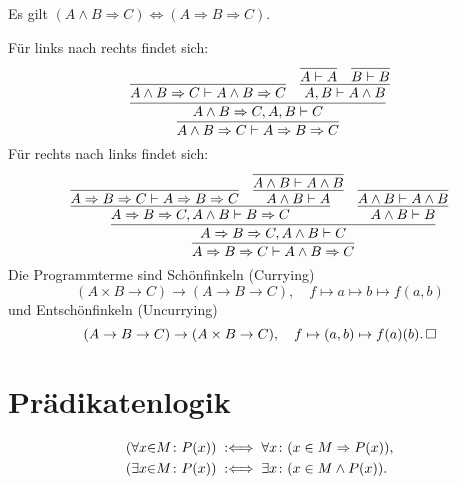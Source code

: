 \begin{Satz}\label{curry-impl}
Es gilt $(A\land B\Rightarrow C)\iff (A\Rightarrow B\Rightarrow C)$.
\end{Satz}
\begin{Beweis}
Für links nach rechts findet sich:
\[
\infer{A\land B\Rightarrow C\vdash A\Rightarrow B\Rightarrow C}{
  \infer{A\land B\Rightarrow C, A, B\vdash C}{
    \infer{A\land B\Rightarrow C\vdash A\land B\Rightarrow C}{}
    & \infer{A, B\vdash A\land B}{
        \infer{A\vdash A}{} & \infer{B\vdash B}{}}}}
\]
Für rechts nach links findet sich:
\[
\infer{A\Rightarrow B\Rightarrow C\vdash A\land B\Rightarrow C}{
  \infer{A\Rightarrow B\Rightarrow C, A\land B\vdash C}{
    \infer{A\Rightarrow B\Rightarrow C, A\land B\vdash B\Rightarrow C}{
      \infer{A\Rightarrow B\Rightarrow C\vdash A\Rightarrow B\Rightarrow C}{}
      & \infer{A\land B\vdash A}{\infer{A\land B\vdash A\land B}{}}}
    & \infer{A\land B\vdash B}{\infer{A\land B\vdash A\land B}{}}}}
\]
Die Programmterme sind Schönfinkeln (Currying)
\[(A\times B\to C)\to (A\to B\to C),\quad
f\mapsto a\mapsto b\mapsto f(a,b)\]
und Entschönfinkeln (Uncurrying)
\[(A\to B\to C)\to (A\times B\to C),\quad
f\mapsto (a, b)\mapsto f(a)(b).\,\square\]
\end{Beweis}

\newpage
\section{Prädikatenlogik}

\begin{Definition}%
\label{def:bounded}
\begin{align}
(\forall x{\in}M\colon P(x)) &\;:\Longleftrightarrow\; \forall x\colon (x\in M\Rightarrow P(x)),\\
(\exists x{\in}M\colon P(x)) &\;:\Longleftrightarrow\; \exists x\colon (x\in M\land P(x)).
\end{align}
\end{Definition}

